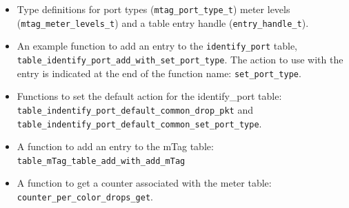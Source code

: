 \documentclass[12pt]{article}
\begin{document}
\begin{itemize}
\item
Type definitions for port types (\texttt{mtag_port_type_t}) meter levels \\
(\texttt{mtag_meter_levels_t}) 
and a table entry handle (\texttt{entry_handle_t}).  
\item
An example function to add an entry to the \texttt{identify_port} table, \\
\texttt{table_identify_port_add_with_set_port_type}. 
The action to use with the entry is indicated at the end of the function name: 
\texttt{set_port_type}.
\item
Functions to set the default action for the identify_port table: \\
\texttt{table_indentify_port_default_common_drop_pkt} and \\
\texttt{table_indentify_port_default_common_set_port_type}.
\item
A function to add an entry to the mTag table: \\
\texttt{table_mTag_table_add_with_add_mTag}
\item
A function to get a counter associated with the meter table: \\
\texttt{counter_per_color_drops_get}.
\end{itemize}
\end{document}
